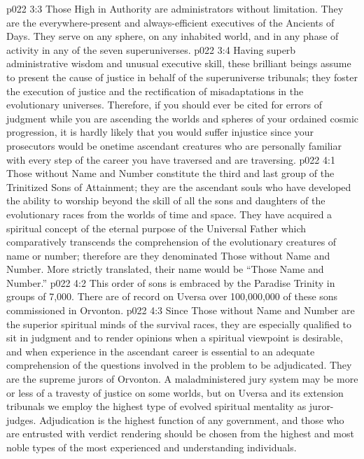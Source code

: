 \vs p022 3:3 Those High in Authority are administrators without limitation. They are the everywhere\hyp{}present and always\hyp{}efficient executives of the Ancients of Days. They serve on any sphere, on any inhabited world, and in any phase of activity in any of the seven superuniverses.
\vs p022 3:4 Having superb administrative wisdom and unusual executive skill, these brilliant beings assume to present the cause of justice in behalf of the superuniverse tribunals; they foster the execution of justice and the rectification of misadaptations in the evolutionary universes. Therefore, if you should ever be cited for errors of judgment while you are ascending the worlds and spheres of your ordained cosmic progression, it is hardly likely that you would suffer injustice since your prosecutors would be onetime ascendant creatures who are personally familiar with every step of the career you have traversed and are traversing.
\vs p022 4:1 Those without Name and Number constitute the third and last group of the Trinitized Sons of Attainment; they are the ascendant souls who have developed the ability to worship beyond the skill of all the sons and daughters of the evolutionary races from the worlds of time and space. They have acquired a spiritual concept of the eternal purpose of the Universal Father which comparatively transcends the comprehension of the evolutionary creatures of name or number; therefore are they denominated Those without Name and Number. More strictly translated, their name would be “Those  Name and Number.”
\vs p022 4:2 This order of sons is embraced by the Paradise Trinity in groups of 7,000. There are of record on Uversa over 100,000,000 of these sons commissioned in Orvonton.
\vs p022 4:3 Since Those without Name and Number are the superior spiritual minds of the survival races, they are especially qualified to sit in judgment and to render opinions when a spiritual viewpoint is desirable, and when experience in the ascendant career is essential to an adequate comprehension of the questions involved in the problem to be adjudicated. They are the supreme jurors of Orvonton. A maladministered jury system may be more or less of a travesty of justice on some worlds, but on Uversa and its extension tribunals we employ the highest type of evolved spiritual mentality as juror\hyp{}judges. Adjudication is the highest function of any government, and those who are entrusted with verdict rendering should be chosen from the highest and most noble types of the most experienced and understanding individuals.

